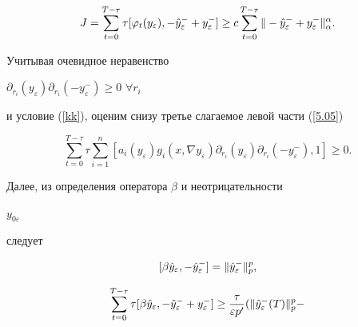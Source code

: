\begin{pf}
\begin{equation}
 J = \sum^{T-\tau}_{t=0}\tau [ \varphi _{t}(y_\varepsilon),


 -\Hat{y}_\varepsilon^{-} + y_\varepsilon^{-} ] \ge


 c \sum^{T-\tau}_{t=0} \|


-\Hat{y}_\varepsilon^{-} + y_\varepsilon^{-}


 \|^\alpha_\alpha.\label{zb2}


\end{equation}


Учитывая очевидное неравенство


$\partial_{r_i} (y_\varepsilon)


\partial_{r_i} (-y_\varepsilon^{-}) \ge 0$ $\forall r_i$


и условие (\ref{kk}), оценим снизу третье слагаемое левой части (\ref{5.05})


\begin{equation}


\sum^{T-\tau}_{t=0} \tau


 \sum^n_{i=1} [ a_i(y_\varepsilon)g_i(x,\nabla y_\varepsilon)


 \partial_{r_i} (y_\varepsilon)


  \partial_{r_i} (-y_\varepsilon^{-}), 1 ] \ge 0.


\label{5.010}


\end{equation}


Далее, из определения оператора $\beta$ и неотрицательности


$y_{0\varepsilon}$


следует


\begin{equation}


[ \beta\Hat{y}_\varepsilon, -\Hat{y}_\varepsilon^{-} ] =


\| \Hat{y}_\varepsilon^{-}\|^{p}_p,


\label{5.011}


\end{equation}


%


\begin{equation}


\sum^{T-\tau}_{t=0}\tau


[ \beta\Hat{y}_\varepsilon, -\Hat{y}_\varepsilon^{-}


+ y_\varepsilon^{-} ] \ge


\frac{\tau}{\varepsilon p'}


(\| \Hat{y}_\varepsilon^{-}(T)\|^p_p-



\end{equation}
\end{pf}
